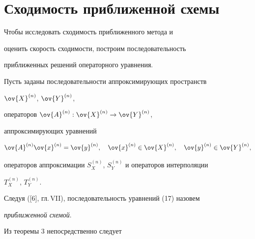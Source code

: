 \section{Сходимость приближенной схемы}





Чтобы исследовать сходимость приближенного метода и


оценить скорость сходимости, построим последовательность


приближенных решений операторного уравнения.





Пусть заданы последовательности аппроксимирующих пространств


$\ov{X}^{(n)}$, $\ov{Y}^{(n)}$,


операторов $\ov{A}^{(n)}: \ov{X}^{(n)} \to \ov{Y}^{(n)}$,


аппроксимирующих уравнений


\begin{equation}


\ov{A}^{(n)}\ov{x}^{(n)} = \ov{y}^{(n)},\quad \ov{x}^{(n)}\in\ov{X}^{(n)},


\quad\ov{y}^{(n)}\in\ov{Y}^{(n)},


\end{equation}


операторов аппроксимации $S^{(n)}_X$, $S^{(n)}_Y$ и операторов интерполяции


$T^{(n)}_X$, $T^{(n)}_Y$.


Следуя ([6], гл.\,VII), последовательность уравнений (17) назовем 


{\it приближенной схемой}.





Из теоремы 3 непосредственно следует





